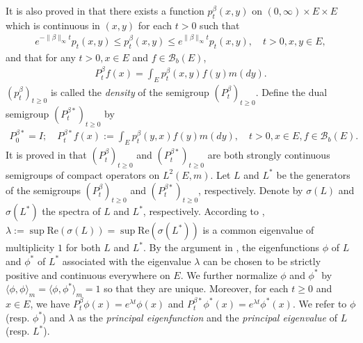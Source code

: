 \documentclass[12pt,a4paper]{amsart}
\theoremstyle{definition}
\numberwithin{equation}{section}
\begin{document}
It is also proved in \cite{RenSongZhang2015Limit, RenSongZhang2017Central} that there exists a function $p^\beta_t(x,y)$ on $(0,\infty) \times E \times E$ which is continuous in $(x,y)$ for each $t>0$ such that
\begin{align}
	e^{-\|\beta\|_\infty t} p_t(x,y)
	\leq p^{\beta}_t(x,y)
	\leq e^{\|\beta\|_\infty t} p_t(x,y),
	\quad t>0, x, y\in E,
\end{align}
and that for any $t>0, x\in E$ and $f \in \mathscr B_b(E)$,
\begin{align}
	P^\beta_t f(x)
	= \int_E p_t^\beta (x,y) f(y) m(dy).
\end{align}
$(p^\beta_t)_{t\geq 0}$ is called the
\emph{density}  of the semigroup $(P^\beta_t)_{t\geq 0}$.
Define the dual semigroup $(P^{\beta *}_t)_{t \geq 0}$ by
\begin{align}
	P^{\beta *}_0 = I;
	\quad P^{\beta *}_t f(x)
	:= \int_E p^\beta_t (y,x) f(y) m(dy),
	\quad t>0, x\in E, f\in \mathscr B_b(E).
\end{align}
It is proved in \cite{RenSongZhang2015Limit, RenSongZhang2017Central} that $(P^\beta_t)_{t \geq 0}$ and $(P^{\beta *}_t)_{t \geq 0}$ are both strongly continuous semigroups of compact operators on $L^2(E,m)$.
Let $L$ and $L^*$ be the generators of the semigroups $(P^\beta_t)_{t \geq 0}$ and $(P^{\beta *}_t)_{t \geq 0}$, respectively.
Denote by $\sigma(L)$ and $\sigma(L^*)$ the spectra of $L$ and $L^*$, respectively.
According to \cite[Theorem V.6.6]{Schaefer1974Banach}, $\lambda := \sup \text{Re}(\sigma(L)) = \sup \text{Re}(\sigma(L^*))$ is a common eigenvalue of multiplicity $1$ for both $L$ and $L^*$.
By the argument in \cite{RenSongZhang2015Limit}, the eigenfunctions $\phi$ of $L$ and $\phi^*$ of $L^*$ associated with the eigenvalue $\lambda$ can be chosen to be strictly positive and continuous everywhere on $E$.
We further normalize $\phi$ and $\phi^*$ by $\langle\phi, \phi\rangle_m = \langle\phi,\phi^*\rangle_m = 1$ so that they are unique.
  Moreover, for each $t\geq 0$ and $x\in E$, we have $P^\beta_t \phi(x) = e^{\lambda t} \phi(x)$ and $P^{\beta *}_t \phi^*(x) = e^{\lambda t} \phi^*(x)$.
We refer to $\phi$ (resp. $\phi^*$) and $\lambda$ as the \emph{principal eigenfunction} and the \emph{principal eigenvalue} of $L$ (resp. $L^*$).
	
\end{document}
